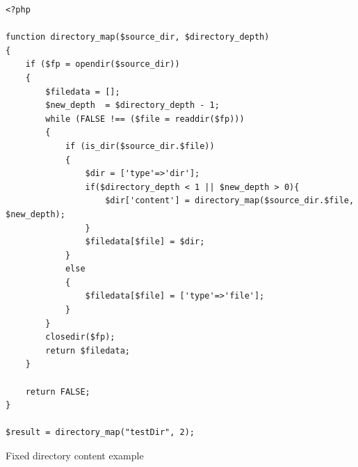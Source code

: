 \begin{program}
\begin{lstlisting}
<?php

function directory_map($source_dir, $directory_depth)
{
    if ($fp = opendir($source_dir))
    {
        $filedata = [];
        $new_depth	= $directory_depth - 1;
        while (FALSE !== ($file = readdir($fp)))
        {
            if (is_dir($source_dir.$file))
            {
                $dir = ['type'=>'dir'];
                if($directory_depth < 1 || $new_depth > 0){
                    $dir['content'] = directory_map($source_dir.$file, $new_depth);
                }
                $filedata[$file] = $dir;
            }
            else
            {
                $filedata[$file] = ['type'=>'file'];
            }
        }
        closedir($fp);
        return $filedata;
    }

    return FALSE;
}

$result = directory_map("testDir", 2);
\end{lstlisting}
\caption{Fixed directory content example}
\label{lst:directoryMapFixed}
\end{program}
